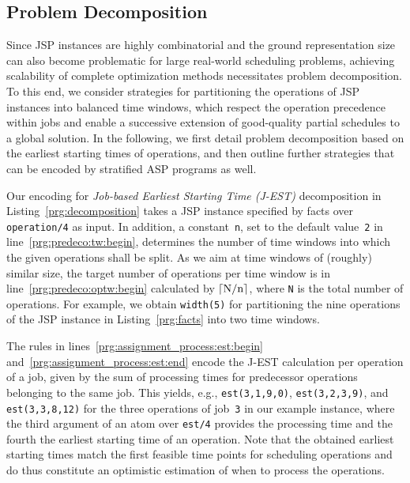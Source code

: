 \documentclass{tlp} %
\begin{document}
\subsection{Problem Decomposition}\label{subsec:decomposition}
%
Since JSP instances are highly combinatorial and the ground representation size
can also become problematic for large real-world scheduling problems, achieving
scalability of complete optimization methods necessitates problem decomposition.
To this end, we consider strategies for partitioning the operations of JSP instances
into balanced time windows, which respect the operation precedence within jobs and
enable a successive extension of good-quality partial schedules to a global solution.
In the following, we first detail problem decomposition based on the earliest starting times of operations, and then outline further strategies that can be encoded by stratified ASP programs as well.


Our encoding for \emph{Job-based Earliest Starting Time (J-EST)} decomposition
in Listing~\ref{prg:decomposition} takes a JSP instance specified by facts over
\lstinline{operation/4} as input.
In addition, a constant~\lstinline{n},
set to the default value~\lstinline{2} in line~\ref{prg:predeco:tw:begin},
determines the number of time windows into which the given operations
shall be split.
As we aim at time windows of (roughly) similar size,
the target number of operations per time window is in line~\ref{prg:predeco:optw:begin}
calculated by $\lceil \text{\lstinline{N}} / \text{\lstinline{n}}\rceil$,
where \lstinline{N} is the total number of operations.
For example, we obtain \lstinline{width(5)} for partitioning the nine operations
of the JSP instance in Listing~\ref{prg:facts} into two time windows.

The rules in lines~\ref{prg:assignment_process:est:begin} and~\ref{prg:assignment_process:est:end}
encode the J-EST calculation per operation of a job,
given by the sum of processing times for predecessor operations belonging to the same job.
This yields, e.g., 
\lstinline{est(3,1,9,0)},
\lstinline{est(3,2,3,9)}, and
\lstinline{est(3,3,8,12)}
for the three operations of job~\lstinline{3} in our example instance,
where the third argument of an atom over \lstinline{est/4} provides
the processing time and the fourth the earliest starting time of an operation.
Note that the obtained earliest starting times match the first feasible time
points for scheduling operations and do thus constitute an optimistic
estimation of when to process the operations.
\end{document}

